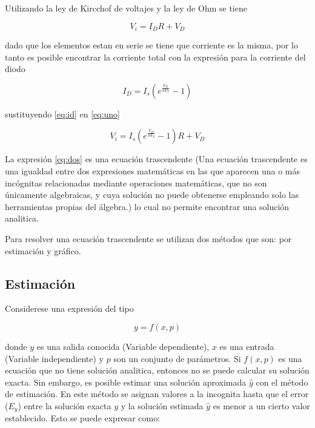 \documentclass[letterpaper,10pt,english]{/usr/lib/python3.3/site-packages/sphinx/texinputs/sphinxhowto}
\begin{document}
Utilizando la ley de Kircchof de voltajes y la ley de Ohm se tiene

\begin{equation}\label{eq:uno}
V_{i}=I_{D}R+V_{D}
\end{equation}

dado que los elementos estan en serie se tiene que corriente es la
misma, por lo tanto es posible encontrar la corriente total con la
expresión para la corriente del diodo

\begin{equation}\label{eq:id}
I_{D}=I_{s}\left( e^{\frac{V_{D}}{nV_{T}}}-1\right)
\end{equation}

sustituyendo \eqref{eq:id} en \eqref{eq:uno}

\begin{equation}\label{eq:dos}
V_{i}=I_{s}\left( e^{\frac{V_{D}}{nV_{T}}}-1\right)R+V_{D}
\end{equation}

La expresión \eqref{eq:dos} es una ecuación trascendente (Una ecuación
trascendente es una igualdad entre dos expresiones matemáticas en las
que aparecen una o más incógnitas relacionadas mediante operaciones
matemáticas, que no son únicamente algebraicas, y cuya solución no puede
obtenerse empleando solo las herramientas propias del álgebra.) lo cual
no permite encontrar una solución analitica.

Para resolver una ecuación trascendente se utilizan dos métodos que son:
por estimación y gráfico.

\subsection{Estimación}

Considerese una expresión del tipo

\begin{equation}\label{eq:idea1}
y=f(x,p)
\end{equation}

donde $y$ es una salida conocida (Variable dependiente), $x$ es una
entrada (Variable independiente) y $p$ son un conjunto de parámetros. Si
$f(x,p)$ es una ecuación que no tiene solución analitica, entonces no se
puede calcular su solución exacta. Sin embargo, es posible estimar una
solución aproximada $\hat{y}$ con el método de estimación. En este
método se asignan valores a la incognita hasta que el error ($E_{y}$)
entre la solución exacta $y$ y la solución estimada $\hat{y}$ es menor a
un cierto valor establecido. Esto se puede expresar como:
\end{document}
